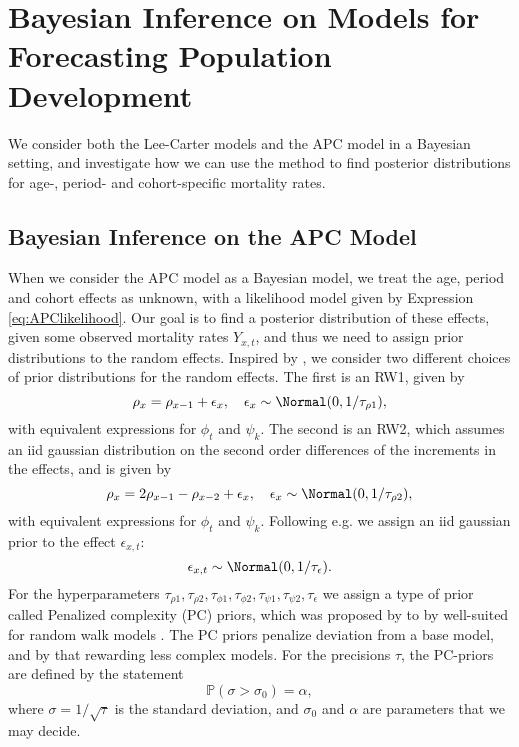 \newpage
\section{Bayesian Inference on Models for Forecasting Population Development}
\label{sec:BayesianInference}
We consider both the Lee-Carter models and the APC model in a Bayesian setting, and investigate how we can use the \inla method to find posterior distributions for age-, period- and cohort-specific mortality rates. 


\subsection{Bayesian Inference on the APC Model}
\label{sec:BayesianInferenceAPC}
When we consider the APC model as a Bayesian model, we treat the age, period and cohort effects as unknown, with a likelihood model given by Expression \ref{eq:APClikelihood}. Our goal is to find a posterior distribution of these effects, given some observed mortality rates $Y_{x,t}$, and thus we need to assign prior distributions to the random effects. Inspired by \parencite{RieblerThesis2010}, we consider two different choices of prior distributions for the random effects. The first is an RW1, given by
\begin{equation}
    \rho_x = \rho_{x-1} + \epsilon_x, \quad \epsilon_x \sim \Normal(0,1/\tau_{\rho1}),
    \label{eq:APCrw1}
\end{equation}
with equivalent expressions for $\phi_t$ and $\psi_k$.
The second is an RW2, which assumes an iid gaussian distribution on the second order differences of the increments in the effects, and is given by
\begin{equation}
    \rho_x = 2\rho_{x-1} - \rho_{x-2} + \epsilon_x, \quad \epsilon_x \sim \Normal(0, 1/\tau_{\rho2}),
    \label{eq:APCrw2}
\end{equation}
with equivalent expressions for $\phi_t$ and $\psi_k$. Following e.g. \textcite{Besag1995} we assign an iid gaussian prior to the effect $\epsilon_{x,t}$:
\begin{equation}
    \epsilon_{x,t} \sim \Normal(0,1/\tau_\epsilon).
\end{equation}
For the hyperparameters $\tau_{\rho 1}, \tau_{\rho 2}, \tau_{\phi 1}, \tau_{\phi 2}, \tau_{\psi 1}, \tau_{\psi 2}, \tau_\epsilon$ we assign a type of prior called Penalized complexity (PC) priors, which was proposed by \textcite{SimpsonRueRiebler2017} to by well-suited for random walk models \parencite{Rubio2020}. The PC priors penalize deviation from a base model, and by that rewarding less complex models. For the precisions $\tau$, the PC-priors are defined by the statement \begin{equation}
    \mathbb{P}(\sigma > \sigma_0) = \alpha,
\end{equation}
where $\sigma = 1/\sqrt{\tau}$ is the standard deviation, and $\sigma_0$ and $\alpha$ are parameters that we may decide. 

